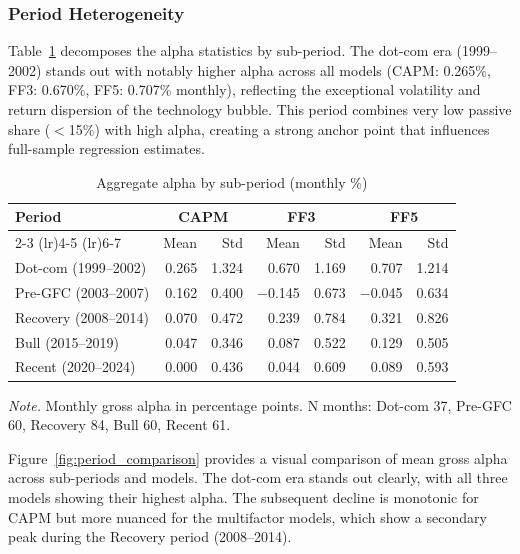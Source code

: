\documentclass[11pt, a4paper]{article}
\begin{document}
\subsubsection{Period Heterogeneity}

Table~\ref{tab:alpha_periods} decomposes the alpha statistics by sub-period. The dot-com era (1999--2002) stands out with notably higher alpha across all models (CAPM: 0.265\%, FF3: 0.670\%, FF5: 0.707\% monthly), reflecting the exceptional volatility and return dispersion of the technology bubble. This period combines very low passive share ($<$15\%) with high alpha, creating a strong anchor point that influences full-sample regression estimates.

\begin{table}[H]
\centering
\caption{Aggregate alpha by sub-period (monthly \%)}
\label{tab:alpha_periods}
\small
\begin{tabular}{lrrrrrr}
\toprule
\textbf{Period} & \multicolumn{2}{c}{\textbf{CAPM}} & \multicolumn{2}{c}{\textbf{FF3}} & \multicolumn{2}{c}{\textbf{FF5}} \\
\cmidrule(lr){2-3} \cmidrule(lr){4-5} \cmidrule(lr){6-7}
 & Mean & Std & Mean & Std & Mean & Std \\
\midrule
Dot-com (1999--2002)    & 0.265 & 1.324 & 0.670 & 1.169 & 0.707 & 1.214 \\
Pre-GFC (2003--2007)    & 0.162 & 0.400 & $-$0.145 & 0.673 & $-$0.045 & 0.634 \\
Recovery (2008--2014)   & 0.070 & 0.472 &  0.239 & 0.784 &  0.321 & 0.826 \\
Bull (2015--2019)       & 0.047 & 0.346 &  0.087 & 0.522 &  0.129 & 0.505 \\
Recent (2020--2024)     & 0.000 & 0.436 &  0.044 & 0.609 &  0.089 & 0.593 \\
\bottomrule
\end{tabular}
\begin{flushleft}
\small\textit{Note.} Monthly gross alpha in percentage points. N months: Dot-com 37, Pre-GFC 60, Recovery 84, Bull 60, Recent 61.
\end{flushleft}
\end{table}

Figure~\ref{fig:period_comparison} provides a visual comparison of mean gross alpha across sub-periods and models. The dot-com era stands out clearly, with all three models showing their highest alpha. The subsequent decline is monotonic for CAPM but more nuanced for the multifactor models, which show a secondary peak during the Recovery period (2008--2014).
\end{document}
